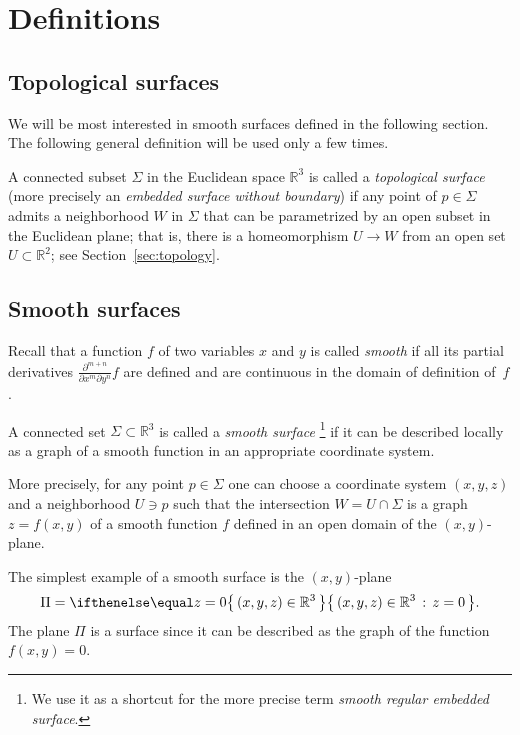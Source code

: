 \chapter{Definitions}
\label{chap:surfaces-def}

\section{Topological surfaces}

We will be most interested in smooth surfaces defined in the following section.
The following general definition will be used only a few times.

A connected subset $\Sigma$ in the Euclidean space $\mathbb{R}^3$
is called a \emph{topological surface} (more precisely an {}\emph{embedded surface without boundary}) 
if any point of $p\in \Sigma$ admits a neighborhood $W$ in $\Sigma$ 
that can be parametrized by an open subset in the Euclidean plane; 
that is, there is a homeomorphism $U\to W$ from an open set $U\subset \mathbb{R}^2$; see Section~\ref{sec:topology}.


\section{Smooth surfaces}\label{sec:def-smooth-surface}

Recall that a function $f$ of two variables $x$ and $y$ is called \emph{smooth} if all its partial derivatives $\frac{\partial^{m+n}}{\partial x^m\partial y^n}f$ are defined and are continuous in the domain of definition of~$f$. 

A connected set $\Sigma \subset \mathbb{R}^3$ is called a \emph{smooth surface}%
\footnote{We use it as a shortcut for the more precise term {}\emph{smooth regular embedded surface}.} if it can be described locally as a graph of a smooth function in an appropriate coordinate system.

More precisely, for any point $p\in \Sigma$ one can choose a coordinate system $(x,y,z)$ and a neighborhood $U\ni p$ such that
the intersection $W=U\cap \Sigma$ is a graph $z=f(x,y)$ of a smooth function $f$ defined in an open domain of the $(x,y)$-plane.

The simplest example of a smooth surface is the $(x,y)$-plane 
\[\Pi=\set{(x,y,z)\in\mathbb{R}^3}{z=0}.\]
The plane $\Pi$ is a surface since
it can be described as the graph of the function $f(x,y)=0$.

